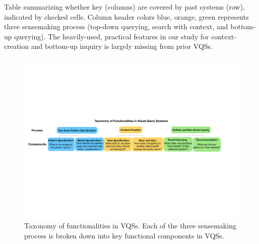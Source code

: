 {\begin{table}
    \caption{Table summarizing whether key  (columns) are covered by past systems (row), indicated by checked cells. Column header colors blue, orange, green represents three sensemaking process (top-down querying, search with context, and bottom-up querying). The heavily-used, practical features in our study for context-creation and bottom-up inquiry is largely missing from prior VQSs.}
    \label{table:relatedwork}
    \vspace{-10pt}
\end{table}
\begin{figure}[ht!]
  \centering
  \includegraphics[width=0.9\linewidth]{figures/taxonomy.pdf}
  \caption{Taxonomy of functionalities in VQSs. Each of the three sensemaking process is broken down into key functional components in VQSs. } %
  \label{fig:taxonomy}
\end{figure}
}
